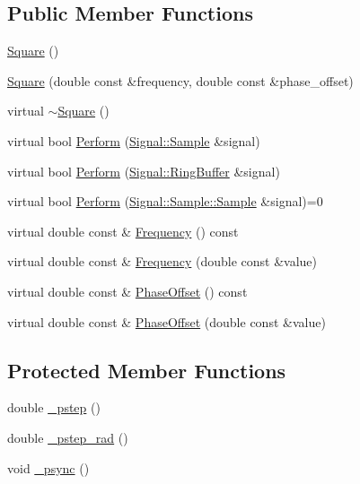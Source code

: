 \subsection*{Public Member Functions}
\begin{DoxyCompactItemize}
\item 
\hyperlink{classDSG_1_1Analog_1_1Square_a799e701fe40f5b16b545f1aa4319d85b}{Square} ()
\item 
\hyperlink{classDSG_1_1Analog_1_1Square_ac538d520cf54fbfde13587bd9282287d}{Square} (double const \&frequency, double const \&phase\-\_\-offset)
\item 
virtual \hyperlink{classDSG_1_1Analog_1_1Square_a33b00e53b72dcaf1464f8759d5defe19}{$\sim$\-Square} ()
\item 
virtual bool \hyperlink{classDSG_1_1Analog_1_1Square_a2102e50f2ff90e2903b50f704cf56ed1}{Perform} (\hyperlink{classDSG_1_1Signal_1_1Sample}{Signal\-::\-Sample} \&signal)
\item 
virtual bool \hyperlink{classDSG_1_1Analog_1_1Square_ab4c127180a2e74870be6f6fbd6cf1e39}{Perform} (\hyperlink{classDSG_1_1Signal_1_1RingBuffer}{Signal\-::\-Ring\-Buffer} \&signal)
\item 
virtual bool \hyperlink{classDSG_1_1SignalProcess_ae8a803d175eca1ec5f34a52035a082b4}{Perform} (\hyperlink{classDSG_1_1Signal_1_1Sample_a21db6fade3ee3554ed3887cb2b74daff}{Signal\-::\-Sample\-::\-Sample} \&signal)=0
\item 
virtual double const \& \hyperlink{classDSG_1_1SignalGenerator_aedac746c5a70818d120858542ecb7c45}{Frequency} () const 
\item 
virtual double const \& \hyperlink{classDSG_1_1SignalGenerator_ae3ce8d45bafabbd86a0f535b15c3cd46}{Frequency} (double const \&value)
\item 
virtual double const \& \hyperlink{classDSG_1_1SignalGenerator_a1ce521847edd0b837fd840998f906b4b}{Phase\-Offset} () const 
\item 
virtual double const \& \hyperlink{classDSG_1_1SignalGenerator_a08b71b1f30ba65e629642c570291dc0e}{Phase\-Offset} (double const \&value)
\end{DoxyCompactItemize}
\subsection*{Protected Member Functions}
\begin{DoxyCompactItemize}
\item 
double \hyperlink{classDSG_1_1SignalGenerator_ac0d781b8673b3a283bf7c133290ede50}{\-\_\-pstep} ()
\item 
double \hyperlink{classDSG_1_1SignalGenerator_ae660eb4caa88b8d278f8d24d0908a487}{\-\_\-pstep\-\_\-rad} ()
\item 
void \hyperlink{classDSG_1_1SignalGenerator_a05baccb38d1e52860d4fcf7cb8430efc}{\-\_\-psync} ()
\end{DoxyCompactItemize}
